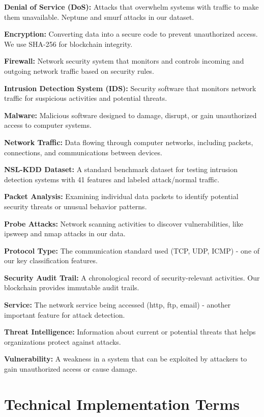 \documentclass[12pt,a4paper]{report}
\begin{document}
\textbf{Denial of Service (DoS):} Attacks that overwhelm systems with traffic to make them unavailable. Neptune and smurf attacks in our dataset.

\textbf{Encryption:} Converting data into a secure code to prevent unauthorized access. We use SHA-256 for blockchain integrity.

\textbf{Firewall:} Network security system that monitors and controls incoming and outgoing network traffic based on security rules.

\textbf{Intrusion Detection System (IDS):} Security software that monitors network traffic for suspicious activities and potential threats.

\textbf{Malware:} Malicious software designed to damage, disrupt, or gain unauthorized access to computer systems.

\textbf{Network Traffic:} Data flowing through computer networks, including packets, connections, and communications between devices.

\textbf{NSL-KDD Dataset:} A standard benchmark dataset for testing intrusion detection systems with 41 features and labeled attack/normal traffic.

\textbf{Packet Analysis:} Examining individual data packets to identify potential security threats or unusual behavior patterns.

\textbf{Probe Attacks:} Network scanning activities to discover vulnerabilities, like ipsweep and nmap attacks in our data.

\textbf{Protocol Type:} The communication standard used (TCP, UDP, ICMP) - one of our key classification features.

\textbf{Security Audit Trail:} A chronological record of security-relevant activities. Our blockchain provides immutable audit trails.

\textbf{Service:} The network service being accessed (http, ftp, email) - another important feature for attack detection.

\textbf{Threat Intelligence:} Information about current or potential threats that helps organizations protect against attacks.

\textbf{Vulnerability:} A weakness in a system that can be exploited by attackers to gain unauthorized access or cause damage.

\section{Technical Implementation Terms}
\end{document}
